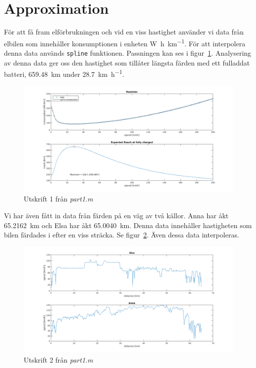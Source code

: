 \documentclass[]{scrreprt}
\begin{document}
\section{Approximation}
För att få fram elförbrukningen och vid en viss hastighet använder vi data från elbilen som innehåller konsumptionen i enheten \si{\watt\hour\per\kilo\meter}.
För att interpolera denna data används \texttt{spline} funktionen. Passningen kan ses i figur~\ref{fig:rgraph}.
Analysering av denna data ger oss den hastighet som tillåter längsta färden med ett fulladdat batteri, \SI{659.48}{\kilo\meter} under \SI{28.7}{\kilo\meter\per\hour}.
\begin{figure}[H]
	\caption{Utskrift 1 från \textit{part1.m}}
	\label{fig:rgraph}
	\includegraphics[width=1.2\textwidth]{roadster/part1.png}
\end{figure}
Vi har även fått in data från färden på en väg av två källor. Anna har åkt \SI{65.2162}{\kilo\meter} och Elsa har åkt \SI{65.0040}{\kilo\meter}. Denna data innehåller hastigheten som bilen färdades i efter en viss sträcka. Se figur~\ref{fig:ea_graph}. Även dessa data interpoleras.
\begin{figure}[H]
	\caption{Utskrift 2 från \textit{part1.m}}
	\label{fig:ea_graph}
	\includegraphics[width=1.2\textwidth]{roadster/elsa_anna.png}
\end{figure}
\end{document}
